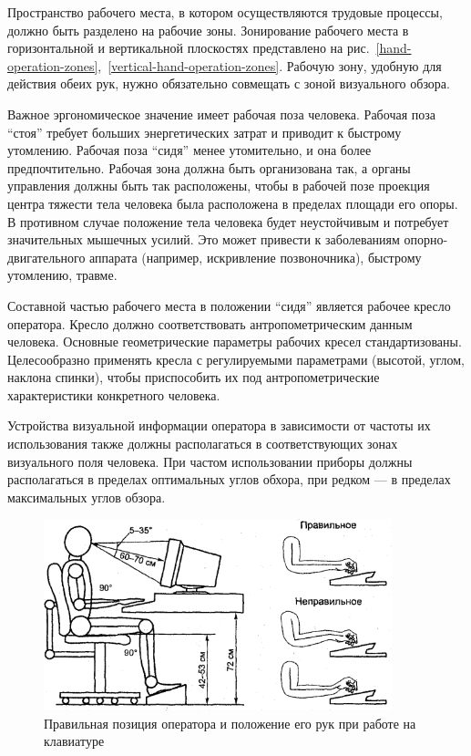 Пространство рабочего места, в котором осуществляются трудовые процессы, должно быть разделено на рабочие зоны. Зонирование рабочего места в горизонтальной и вертикальной плоскостях представлено на рис.~\ref{hand-operation-zones},~\ref{vertical-hand-operation-zones}. Рабочую зону, удобную для действия обеих рук, нужно обязательно совмещать с зоной визуального обзора.

Важное эргономическое значение имеет рабочая поза человека. Рабочая поза ``стоя'' требует больших энергетических затрат и приводит к быстрому утомлению. Рабочая поза ``сидя'' менее утомительно, и она более предпочтительно. Рабочая зона должна быть организована так, а органы управления должны быть так расположены, чтобы в рабочей позе проекция центра тяжести тела человека была расположена в пределах площади его опоры. В противном случае положение тела человека будет неустойчивым и потребует значительных мышечных усилий. Это может привести к заболеваниям опорно\hyp{}двигательного аппарата (например, искривление позвоночника), быстрому утомлению, травме.

Составной частью рабочего места в положении ``сидя'' является рабочее кресло оператора. Кресло должно соответствовать антропометрическим данным человека. Основные геометрические параметры рабочих кресел стандартизованы. Целесообразно применять кресла с регулируемыми параметрами (высотой, углом, наклона спинки), чтобы приспособить их под антропометрические характеристики конкретного человека.

Устройства визуальной информации оператора в зависимости от частоты их использования также должны располагаться в соответствующих зонах визуального поля человека. При частом использовании приборы должны располагаться в пределах оптимальных углов обхора, при редком --- в пределах максимальных углов обзора.

\begin{figure}
  \centering
  \includegraphics[width=0.9\textwidth]{images/mihnuk-3-14}
  \caption{Правильная позиция оператора и положение его рук при работе на клавиатуре\label{operator-position}}
\end{figure}

